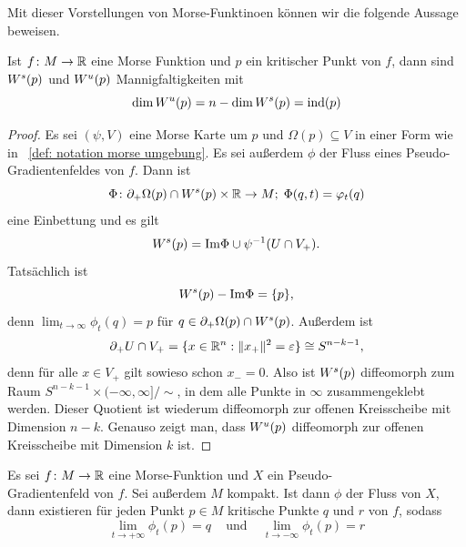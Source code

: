 Mit dieser Vorstellungen von Morse-Funktinoen können wir die folgende Aussage beweisen.

\begin{prop}
    Ist $f \colon M \to { \mathbb R }$ eine Morse Funktion und $p$ ein kritischer Punkt von $f$, dann sind
    ${ W^s } (p)$ und ${ W^u } (p)$ Mannigfaltigkeiten mit 
    \[ \dim { W^u } (p) = n - \dim { W^s } (p) = { \operatorname{ind} } (p) \]
\end{prop}

\begin{proof}
    Es sei $(\psi, V)$ eine Morse Karte um $p$ und $\Omega(p) \subseteq V$ in einer Form wie 
    in ~\ref{def: notation morse umgebung}. Es sei außerdem $\phi$ der Fluss eines 
    Pseudo-Gradientenfeldes von $f$. Dann ist 
    \[ \Phi \colon { \partial }_+ \Omega (p) \cap { W^s } (p) \times { \mathbb R } \to M ; \; \Phi (q, t) = \varphi_t(q) \]
    eine Einbettung und es gilt 
    \[ { W^s } (p) = { \operatorname{Im} } \Phi \cup \psi^{-1}(U \cap V_+) . \]
    Tatsächlich ist 
    \[ { W^s } (p) - { \operatorname{Im} } \Phi = \{ p \} , \]
    denn $\lim_{t \to \infty} \phi_t(q) = p$ für $q \in { \partial }_+ \Omega (p) \cap { W^s } (p)$. 
    Außerdem ist 
    \[ { \partial }_+ U \cap V_+ = \{ x \in { \mathbb R }^n: \| x_+ \|^2 = \varepsilon \} \cong S^{n - k - 1} , \] 
    denn für alle $x \in V_+$ gilt sowieso schon $x_- = 0$. Also ist ${ W^s }(p)$ diffeomorph zum Raum 
    $S^{n - k - 1} \times (-\infty, \infty]/\sim$, in dem alle Punkte in $\infty$ zusammengeklebt 
    werden. Dieser Quotient ist wiederum diffeomorph zur offenen Kreisscheibe mit Dimension $n - k$.
    Genauso zeigt man, dass ${ W^u } (p)$ diffeomorph zur offenen Kreisscheibe mit Dimension $k$ ist.
\end{proof}

\begin{prop}
    \label{prop: trajektorien enden in kritischen punkten}
    Es sei $f \colon M \to { \mathbb R }$ eine Morse-Funktion und $X$ ein Pseudo-\\Gradientenfeld von $f$. 
    Sei außerdem $M$ kompakt. Ist dann $\phi$ der Fluss von $X$, dann existieren für jeden Punkt 
    $p \in M$ kritische Punkte $q$ und $r$ von $f$, sodass
    \[ \lim_{t \to + \infty} \phi_t(p) = q \;\;\; 
    \text{ und } \;\;\; \lim_{t \to -\infty} \phi_t(p) = r \]
\end{prop}

